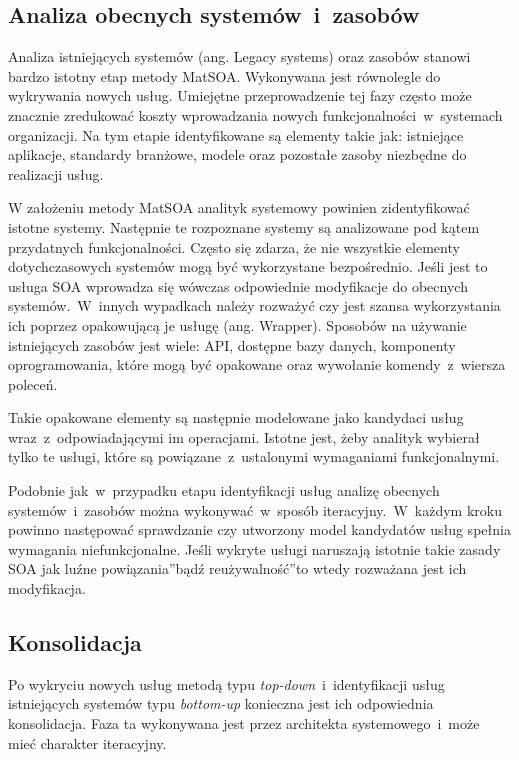\subsection*{Analiza obecnych systemów~i~zasobów}
Analiza istniejących systemów (ang. Legacy systems) oraz zasobów stanowi bardzo istotny etap metody MatSOA. Wykonywana jest równolegle do wykrywania nowych usług. Umiejętne przeprowadzenie tej fazy często może znacznie zredukować koszty wprowadzania nowych funkcjonalności~w~systemach organizacji. Na tym etapie identyfikowane są elementy takie jak: istniejące aplikacje, standardy branżowe, modele oraz pozostałe zasoby niezbędne do realizacji usług. 

W założeniu metody MatSOA analityk systemowy powinien zidentyfikować istotne systemy. Następnie te rozpoznane systemy są analizowane pod kątem przydatnych funkcjonalności. Często się zdarza, że nie wszystkie elementy dotychczasowych systemów mogą być wykorzystane bezpośrednio. Jeśli jest to usługa SOA wprowadza się wówczas odpowiednie modyfikacje do obecnych systemów.~W~innych wypadkach należy rozważyć czy jest szansa wykorzystania ich poprzez opakowującą je usługę (ang. Wrapper). Sposobów na używanie istniejących zasobów jest wiele: API, dostępne bazy danych, komponenty oprogramowania, które mogą być opakowane oraz wywołanie komendy~z~wiersza poleceń.

Takie opakowane elementy są następnie modelowane jako kandydaci usług wraz~z~odpowiadającymi im operacjami. Istotne jest, żeby analityk wybierał tylko te usługi, które są powiązane~z~ustalonymi wymaganiami funkcjonalnymi.

Podobnie jak~w~przypadku etapu identyfikacji usług analizę obecnych systemów~i~zasobów można wykonywać~w~sposób iteracyjny.~W~każdym kroku powinno następować sprawdzanie czy utworzony model kandydatów usług spełnia wymagania niefunkcjonalne. Jeśli wykryte usługi naruszają istotnie takie zasady SOA jak \quotedblbase luźne powiązania\textquotedblright bądź \quotedblbase reużywalność\textquotedblright to wtedy rozważana jest ich modyfikacja.

\subsection{Konsolidacja}
Po wykryciu nowych usług metodą typu \emph{top-down}~i~identyfikacji usług istniejących systemów typu \emph{bottom-up} konieczna jest ich odpowiednia konsolidacja. Faza ta wykonywana jest przez architekta systemowego~i~może mieć charakter iteracyjny.

